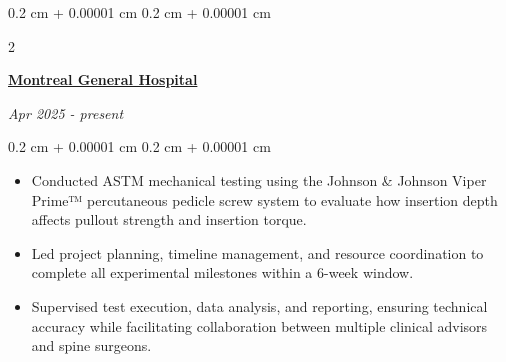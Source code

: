 \documentclass[10pt, letterpaper]{article}
\newenvironment{highlights}{
    \begin{itemize}[
        topsep=0.10 cm,
        parsep=0.10 cm,
        partopsep=0pt,
        itemsep=0pt,
        leftmargin=0.4 cm + 10pt
    ]
}{
    \end{itemize}
} %
\newenvironment{onecolentry}{
    \begin{adjustwidth}{
        0.2 cm + 0.00001 cm
    }{
        0.2 cm + 0.00001 cm
    }
}{
    \end{adjustwidth}
} %
\newenvironment{twocolentry}[2][]{
    \onecolentry
    \def\secondColumn{#2}
    \setcolumnwidth{\fill, 4.5 cm}
    \begin{paracol}{2}
}{
    \switchcolumn \raggedleft \secondColumn
    \end{paracol}
    \endonecolentry
} %
\let\hrefWithoutArrow\href
\renewcommand{\href}[2]{\hrefWithoutArrow{#1}{\ifthenelse{\equal{#2}{}}{ }{#2 }\raisebox{.15ex}{\footnotesize \faExternalLink*}}}
\begin{document}
        \vspace{0.2 cm}

      \begin{twocolentry}{\textit{Apr 2025 - present}}
            \textbf{\hrefWithoutArrow{https://www.mcgill.ca/orl/about-us}{Montreal General Hospital}}
        \end{twocolentry}

        \vspace{0.10 cm}
        \begin{onecolentry}
            \begin{highlights}
                
                \item Conducted ASTM mechanical testing using the Johnson \& Johnson Viper Prime™ percutaneous pedicle screw system to evaluate how insertion depth affects pullout strength and insertion torque.

                \item Led project planning, timeline management, and resource coordination to complete all experimental milestones within a 6-week window.

                 \item Supervised test execution, data analysis, and reporting, ensuring technical accuracy while facilitating collaboration between multiple clinical advisors and spine surgeons.

            \end{highlights}
        \end{onecolentry}

        \vspace{0.2 cm}
        
    
        
            

\end{document}
